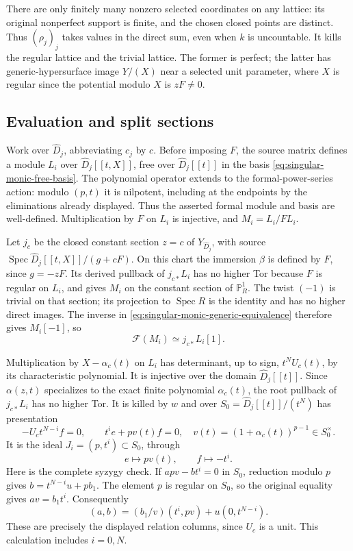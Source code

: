 There are only finitely many nonzero selected coordinates on any
lattice: its original nonperfect support is finite, and the chosen
closed points are distinct.  Thus \((\rho_j)_j\) takes values in
the direct sum, even when \(k\) is uncountable.
It kills the regular lattice and the trivial lattice.  The former
is perfect; the latter has generic-hypersurface image \(Y/(X)\)
near a selected unit parameter, where \(X\) is regular since the
potential modulo \(X\) is \(zF\ne0\).

\subsection{Evaluation and split sections}

Work over \(\widehat D_j\), abbreviating \(c_j\) by \(c\).
Before imposing \(F\), the source matrix defines a module \(L_i\)
over \(\widehat D_j[[t,X]]\), free over \(\widehat D_j[[t]]\)
in the basis \eqref{eq:singular-monic-free-basis}.  The polynomial
operator extends to the formal-power-series action: modulo \((p,t)\)
it is nilpotent, including at the endpoints by the eliminations
already displayed.  Thus the asserted formal module and basis are
well-defined.  Multiplication by \(F\) on \(L_i\) is injective,
and \(M_i=L_i/FL_i\).

Let \(j_c\) be the closed constant section \(z=c\) of \(Y_{\widehat D_j}\),
with source \(\operatorname{Spec}\widehat D_j[[t,X]]/(g+cF)\).
On this chart the immersion \(\beta\) is defined by \(F\), since
\(g=-zF\).  Its derived pullback of \(j_{c*}L_i\) has no higher
Tor because \(F\) is regular on \(L_i\), and gives \(M_i\)
on the constant section of \(\mathbb P^1_R\).  The twist
\((-1)\) is trivial on that section; its projection to
\(\operatorname{Spec}R\) is the identity and has no higher direct
images.  The inverse in \eqref{eq:singular-monic-generic-equivalence}
therefore gives \(M_i[-1]\), so
\begin{equation}\label{eq:singular-monic-image-shift}
 \mathcal F(M_i)\simeq j_{c*}L_i[1].
\end{equation}

Multiplication by \(X-\alpha_c(t)\) on \(L_i\) has determinant,
up to sign, \(t^NU_c(t)\), by its characteristic polynomial.
It is injective over the domain \(\widehat D_j[[t]]\).
Since \(\alpha(z,t)\) specializes to the exact finite polynomial
\(\alpha_c(t)\), the root pullback of \(j_{c*}L_i\) has no
higher Tor.  It is killed by \(w\) and over
\(S_0=\widehat D_j[[t]]/(t^N)\) has presentation
\begin{equation}\label{eq:singular-monic-root-presentation}
 -U_ct^{N-i}f=0,\qquad t^ie+p v(t)f=0,
 \quad v(t)=(1+\alpha_c(t))^{p-1}\in S_0^\times.
\end{equation}
It is the ideal \(J_i=(p,t^i)\subset S_0\), through
\[
 e\longmapsto p v(t),\qquad f\longmapsto-t^i.
\]
Here is the complete syzygy check.  If \(a p v-bt^i=0\) in
\(S_0\), reduction modulo \(p\) gives
\(b=t^{N-i}u+p b_1\).  The element \(p\) is regular on
\(S_0\), so the original equality gives \(av=b_1t^i\).
Consequently
\[
 (a,b)=(b_1/v)(t^i,pv)+u(0,t^{N-i}).
\]
These are precisely the displayed relation columns, since \(U_c\)
is a unit.  This calculation includes \(i=0,N\).

